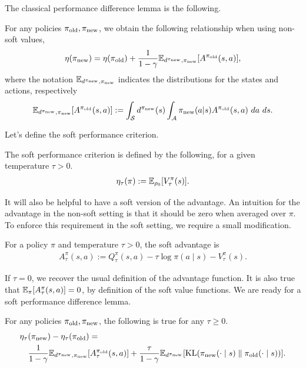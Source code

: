 \documentclass[\main/thesis.tex]{subfiles}
\begin{document}
The classical performance difference lemma is the following. 
\begin{lemma}\label{lemma:perf-diff}
For any policies ${\pi_\mathrm{old}}, {\pi_\mathrm{new}}$, we obtain the following relationship when using non-soft values, 
\begin{align*}
    \eta({\pi_\mathrm{new}}) = \eta({\pi_\mathrm{old}}) + \frac{1}{1 - \gamma} \mathbb{E}_{d^{{\pi_\mathrm{new}}}, {\pi_\mathrm{new}}}[A^{{\pi_\mathrm{old}}}(s, a)],
\end{align*}
where the notation $\mathbb{E}_{d^{{\pi_\mathrm{new}}}, {\pi_\mathrm{new}}}$ indicates the distributions for the states and actions, respectively 
\begin{equation*}
 \mathbb{E}_{d^{{\pi_\mathrm{new}}}, {\pi_\mathrm{new}}}[A^{{\pi_\mathrm{old}}}(s, a)] := \int_{\mathcal{S}} d^{{\pi_\mathrm{new}}}(s) \int_{\mathcal{A}} {\pi_\mathrm{new}}(a | s) A^{{\pi_\mathrm{old}}}(s,a) \ da \ ds.
\end{equation*}
%
\end{lemma}
\noindent Let's define the soft performance criterion. 
\begin{definition}\label{def:soft-performance}
The soft performance criterion is defined by the following, for a given temperature $\tau > 0$.
\begin{align*}
    \eta_\tau(\pi) := \mathbb{E}_{\rho_0}[V^\pi_\tau(s)].
\end{align*}
\end{definition}
It will also be helpful to have a soft version of the advantage. An intuition for the advantage in the non-soft setting is that it should be zero when averaged over $\pi$. To enforce this requirement in the soft setting, we require a small modification.
\begin{definition}\label{def:soft-advantage}
For a policy $\pi$ and temperature $\tau > 0$, the soft advantage is
\begin{align*}
    A^\pi_\tau(s, a) := Q^\pi_\tau(s, a) - \tau \log \pi(a \mid s) - V^\pi_\tau(s).
\end{align*}
\end{definition}
\noindent If $\tau = 0$, we recover the usual definition of the advantage function. It is also true that $\mathbb{E}_\pi[A^\pi_\tau(s, a)]= 0$, by definition of the soft value functions. We are ready for a soft performance difference lemma. 
\begin{lemma}\label{lemma:soft-performance-difference}
For any policies ${\pi_\mathrm{old}}, {\pi_\mathrm{new}}$, the following is true for any $\tau \geq 0$.
\begin{align*}
   &\eta_\tau({\pi_\mathrm{new}}) - \eta_\tau({\pi_\mathrm{old}}) =\\
      &\quad \frac{1}{1 - \gamma}\mathbb{E}_{d^{{\pi_\mathrm{new}}}, {\pi_\mathrm{new}}}[A_\tau^{{\pi_\mathrm{old}}}(s, a)] + \frac{\tau}{1 - \gamma} \mathbb{E}_{d^{\pi_\mathrm{new}}}[\mathrm{KL}({\pi_\mathrm{new}}(\cdot \mid s) \parallel {\pi_\mathrm{old}}(\cdot \mid s))].
\end{align*}
\end{lemma}
\end{document}
